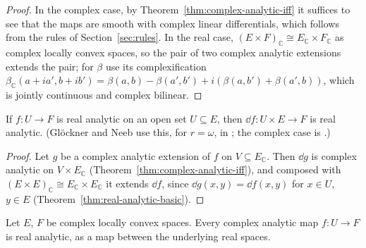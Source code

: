 \begin{proof}
  \leanok
  In the complex case, by Theorem~\ref{thm:complex-analytic-iff} it suffices to see that the maps
  are smooth with complex linear differentials, which follows from the rules of
  Section~\ref{sec:rules}. In the real case, $(E \times F)_{\mathbb{C}} \cong E_{\mathbb{C}}
  \times F_{\mathbb{C}}$ as complex locally convex spaces, so the pair of two complex analytic
  extensions extends the pair; for $\beta$ use its complexification
  $\beta_{\mathbb{C}}(a + ia', b + ib') = \beta(a, b) - \beta(a', b') + i(\beta(a, b') +
  \beta(a', b))$, which is jointly continuous and complex bilinear.
\end{proof}

\begin{theorem}
  \label{thm:real-analytic-dMB}
  \leanok
  If $f \colon U \to F$ is real analytic on an open set $U \subseteq E$, then
  $\dd f \colon U \times E \to F$ is real analytic. (Glöckner and Neeb use this, for $r = \omega$,
  in \cite[Lemma~3.3.8(d)]{GN26}; the complex case is \cite[Lemma~2.6]{Glo02}.)
\end{theorem}

\begin{proof}
  \leanok
  Let $g$ be a complex analytic extension of $f$ on $V \subseteq E_{\mathbb{C}}$. Then $\dd g$ is
  complex analytic on $V \times E_{\mathbb{C}}$ (Theorem~\ref{thm:complex-analytic-iff}), and
  composed with $(E \times E)_{\mathbb{C}} \cong E_{\mathbb{C}} \times E_{\mathbb{C}}$ it extends
  $\dd f$, since $\dd g(x, y) = \dd f(x, y)$ for $x \in U$, $y \in E$
  (Theorem~\ref{thm:real-analytic-basic}).
\end{proof}

\begin{proposition}
  \label{prop:complex-real-analytic}
  \leanok
  Let $E$, $F$ be complex locally convex spaces. Every complex analytic map $f \colon U \to F$
  is real analytic, as a map between the underlying real spaces.
\end{proposition}

